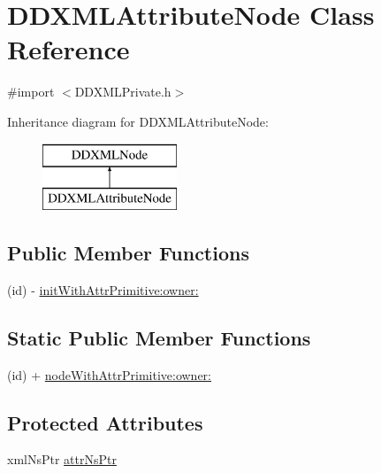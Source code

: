 \hypertarget{class_d_d_x_m_l_attribute_node}{
\section{DDXMLAttributeNode Class Reference}
\label{class_d_d_x_m_l_attribute_node}
}


{\ttfamily \#import $<$DDXMLPrivate.h$>$}

Inheritance diagram for DDXMLAttributeNode:\begin{figure}[H]
\begin{center}
\leavevmode
\includegraphics[height=2cm]{class_d_d_x_m_l_attribute_node}
\end{center}
\end{figure}
\subsection*{Public Member Functions}
\begin{DoxyCompactItemize}
\item 
(id) -\/ \hyperlink{class_d_d_x_m_l_attribute_node_abbfeb4c4026327d6555de5a0be04e507}{initWithAttrPrimitive:owner:}
\end{DoxyCompactItemize}
\subsection*{Static Public Member Functions}
\begin{DoxyCompactItemize}
\item 
(id) + \hyperlink{class_d_d_x_m_l_attribute_node_afab315d722d56fa724459e4e5fde71e4}{nodeWithAttrPrimitive:owner:}
\end{DoxyCompactItemize}
\subsection*{Protected Attributes}
\begin{DoxyCompactItemize}
\item 
xmlNsPtr \hyperlink{class_d_d_x_m_l_attribute_node_a3b2110eaeefe644574732a1f9ebbf647}{attrNsPtr}
\end{DoxyCompactItemize}


